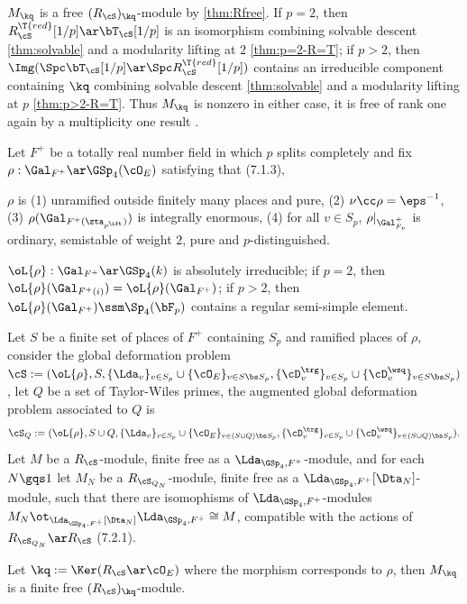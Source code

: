 \documentclass[article, a4paper, twoside]{universal}
\begin{document}
\begin{prf}
    $M_{\kq}$ is a free $(R_{\cS})_{\kq}$-module by \cref{thm:Rfree}. If $p=2$, then $R_{\cS}^{\T{red}}[1/p]\ar\bT_{\cS}[1/p]$ is an isomorphism combining solvable descent \cref{thm:solvable} and a modularity lifting at $2$ \cref{thm:p=2-R=T}; if $p>2$, then $\Img(\Spc\bT_{\cS}[1/p]\ar\Spc R_{\cS}^{\T{red}}[1/p])$ contains an irreducible component containing $\kq$ combining solvable descent \cref{thm:solvable} and a modularity lifting at $p$ \cref{thm:p>2-R=T}. Thus $M_{\kq}$ is nonzero in either case, it is free of rank one again by a multiplicity one result \cite[7.5.8]{BCGP2025}.
\end{prf}

\begin{thm}\label{thm:Rfree}
    Let $F^{+}$ be a totally real number field in which $p$ splits completely and fix $\rho:\Gal_{F^{+}}\ar\GSp_{4}(\cO_{E})$ satisfying that (7.1.3),
    \begin{itm}
        \item $\rho$ is (1) unramified outside finitely many places and pure, (2) $\nu\cc\rho=\eps^{-1}$, (3) $\rho(\Gal_{F^{+}(\zta_{p^{\ift}})})$ is integrally enormous, (4) for all $v\in S_{p}$, $\rho|_{\Gal_{F_{v}}^{+}}$ is ordinary, semistable of weight $2$, pure and $p$-distinguished.
        \item $\oL{\rho}:\Gal_{F^{+}}\ar\GSp_{4}(k)$ is absolutely irreducible; if $p=2$, then $\oL{\rho}(\Gal_{F^{+}(i)})=\oL{\rho}(\Gal_{F^{+}})$; if $p>2$, then $\oL{\rho}(\Gal_{F^{+}})\ssm\Sp_{4}(\bF_{p})$ contains a regular semi-simple element.
    \end{itm}
    Let $S$ be a finite set of places of $F^{+}$ containing $S_{p}$ and ramified places of $\rho$, consider the global deformation problem $\cS:=(\oL{\rho},S,\{\Lda_{v}\}_{v\in S_{p}}\cup\{\cO_{E}\}_{v\in S\bs S_{p}},\{\cD_{v}^{\trg}\}_{v\in S_{p}}\cup\{\cD_{v}^{\wsq}\}_{v\in S\bs S_{p}})$, let $Q$ be a set of Taylor-Wiles primes, the augmented global deformation problem associated to $Q$ is
    \[
        \cS_{Q}:=(\oL{\rho},S\cup Q,\{\Lda_{v}\}_{v\in S_{p}}\cup\{\cO_{E}\}_{v\in (S\cup Q)\bs S_{p}},\{\cD_{v}^{\trg}\}_{v\in S_{p}}\cup\{\cD_{v}^{\wsq}\}_{v\in (S\cup Q)\bs S_{p}}).
    \]
    Let $M$ be a $R_{\cS}$-module, finite free as a $\Lda_{\GSp_{4},F^{+}}$-module, and for each $N\gqs1$ let $M_{N}$ be a $R_{\cS_{Q_{N}}}$-module, finite free as a $\Lda_{\GSp_{4},F^{+}}[\Dta_{N}]$-module, such that there are isomophisms of $\Lda_{\GSp_{4},F^{+}}$-modules $M_{N}\ot_{\Lda_{\GSp_{4},F^{+}}[\Dta_{N}]}\Lda_{\GSp_{4},F^{+}}\cong M$, compatible with the actions of $R_{\cS_{Q_{N}}}\ar R_{\cS}$ (7.2.1).

    Let $\kq:=\Ker(R_{\cS}\ar\cO_{E})$ where the morphism corresponds to $\rho$, then $M_{\kq}$ is a finite free $(R_{\cS})_{\kq}$-module.
\end{thm}
\end{document}
